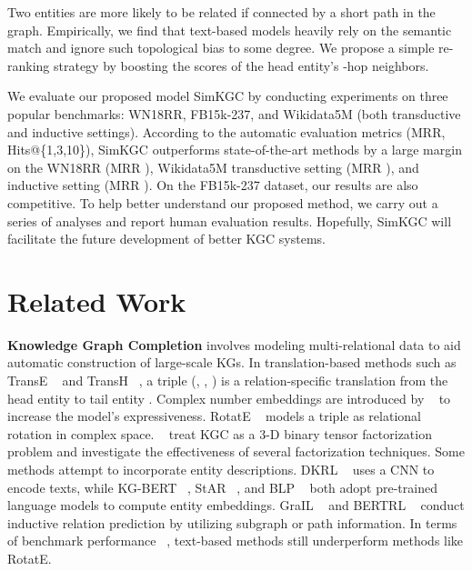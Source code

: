 \documentclass[11pt]{article}
\begin{document}
Two entities are more likely to be related
if connected by a short path in the graph.
Empirically,
we find that text-based models heavily rely on the semantic match
and ignore such topological bias to some degree.
We propose a simple re-ranking strategy
by boosting the scores of the head entity's -hop neighbors.

We evaluate our proposed model SimKGC
by conducting experiments on three popular benchmarks:
WN18RR, FB15k-237, and Wikidata5M (both transductive and inductive settings).
According to the automatic evaluation metrics (MRR, Hits@\{1,3,10\}),
SimKGC outperforms state-of-the-art methods by a large margin
on the WN18RR (MRR ),
Wikidata5M transductive setting (MRR ),
and inductive setting (MRR ).
On the FB15k-237 dataset,
our results are also competitive.
To help better understand our proposed method,
we carry out a series of analyses
and report human evaluation results.
Hopefully,
SimKGC will facilitate the future development of better KGC systems.

\section{Related Work}

\noindent
\textbf{Knowledge Graph Completion }
involves modeling multi-relational data
to aid automatic construction of large-scale KGs.
In translation-based methods
such as TransE ~\citep{bordes2013translating} and TransH ~\citep{wang2014knowledge},
a triple (, , ) is a relation-specific translation
from the head entity  to tail entity .
Complex number embeddings are introduced by ~\citet{trouillon2016complex}
to increase the model's expressiveness.
RotatE ~\citep{sun2018rotate} models a triple as relational rotation in complex space.
~\citet{nickel2011three,balazevic-etal-2019-tucker} treat KGC as a 3-D binary tensor factorization problem
and investigate the effectiveness of several factorization techniques.
Some methods attempt to incorporate entity descriptions.
DKRL ~\citep{xie2016representation} uses a CNN to encode texts,
while KG-BERT ~\citep{yao2019kg}, StAR ~\citep{wang2021structure}, and BLP ~\citep{daza2021inductive}
both adopt pre-trained language models to compute entity embeddings.
GraIL ~\citep{Teru2020InductiveRP} and BERTRL ~\citep{Zha2021InductiveRP}
conduct inductive relation prediction by utilizing subgraph or path information.
In terms of benchmark performance ~\citep{wang2021kepler},
text-based methods still underperform methods like RotatE.
\newline
\end{document}
